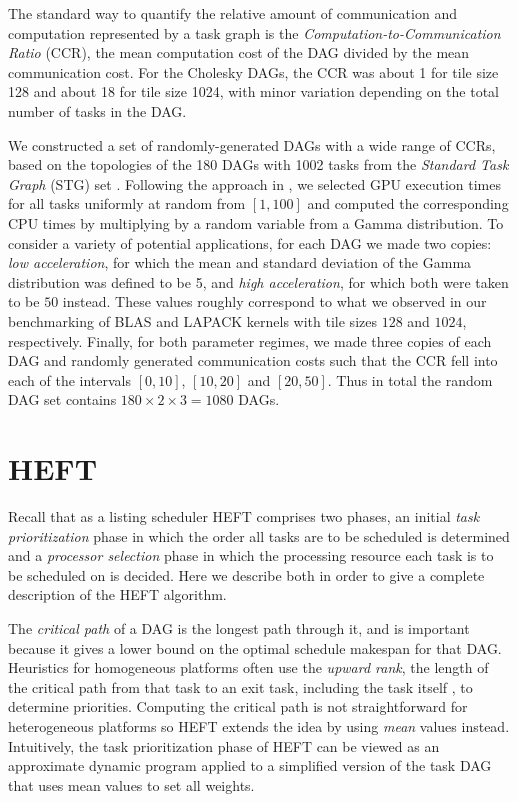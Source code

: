 \documentclass[runningheads]{llncs}
\begin{document}
The standard way to quantify the relative amount of communication and computation represented by a task graph is the {\em Computation-to-Communication Ratio} (CCR), the mean computation cost of the DAG divided by the mean communication cost. For the Cholesky DAGs, the CCR was about 1 for tile size 128 and about 18 for tile size 1024, with minor variation depending on the total number of tasks in the DAG. 

We constructed a set of randomly-generated DAGs with a wide range of CCRs, based on the topologies of the 180 DAGs with 1002 tasks from the {\em Standard Task Graph} (STG) set \cite{Tobita2002}. Following the approach in \cite{canon2018}, we selected GPU execution times for all tasks uniformly at random from $[1, 100]$ and computed the corresponding CPU times by multiplying by a random variable from a Gamma distribution. To consider a variety of potential applications, for each DAG we made two copies: {\em low acceleration}, for which the mean and standard deviation of the Gamma distribution was defined to be 5, and {\em high acceleration}, for which both were taken to be $50$ instead. These values roughly correspond to what we observed in our benchmarking of BLAS and LAPACK kernels with tile sizes $128$ and $1024$, respectively. Finally, for both parameter regimes, we made three copies of each DAG and randomly generated communication costs such that the CCR fell into each of the intervals $[0, 10]$, $[10, 20]$ and $[20, 50]$. Thus in total the random DAG set contains $180 \times 2 \times 3 = 1080$ DAGs.  



\section{HEFT}
\label{sect.HEFT}

Recall that as a listing scheduler HEFT comprises two phases, an initial {\em task prioritization} phase in which the order all tasks are to be scheduled is determined and a {\em processor selection} phase in which the processing resource each task is to be scheduled on is decided. Here we describe both in order to give a complete description of the HEFT algorithm.  

The {\em critical path} of a DAG is the longest path through it, and is important because it gives a lower bound on the optimal schedule makespan for that DAG. Heuristics for homogeneous platforms often use the {\em upward rank}, the length of the critical path from that task to an exit task, including the task itself \cite{topcuoglu2002performance}, to determine priorities. Computing the critical path is not straightforward for heterogeneous platforms so HEFT extends the idea by using {\em mean} values instead. Intuitively, the task prioritization phase of HEFT can be viewed as an approximate dynamic program applied to a simplified version of the task DAG that uses mean values to set all weights.
\end{document}

